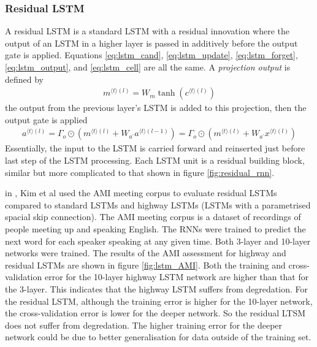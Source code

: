 \documentclass[a4paper,12pt]{article}
\theoremstyle{definition}
\begin{document}
\subsubsection{Residual LSTM \cite{kim}}
A residual LSTM is a standard LSTM with a residual innovation where the output of an LSTM in a higher layer is passed in additively before the output gate is applied. Equations \ref{eq:lstm_cand}, \ref{eq:lstm_update}, \ref{eq:lstm_forget}, \ref{eq:lstm_output}, and \ref{eq:lstm_cell} are all the same. A \textit{projection output} is defined by
\begin{align}
	m^{\langle t \rangle (l)} = W_m \tanh(c^{\langle t \rangle (l)})
\end{align}
the output from the previous layer's LSTM is added to this projection, then the output gate is applied
\begin{align}
	a^{\langle t \rangle (l)} = \Gamma_o \odot \left(m^{\langle t \rangle (l)} + W_{a^{\prime}}a^{\langle t \rangle (l-1)} \right) = \Gamma_o \odot \left(m^{\langle t \rangle (l)} + W_{a^{\prime}}x^{\langle t \rangle (l)} \right)
\end{align}
Essentially, the input to the LSTM is carried forward and reinserted just before last step of the LSTM processing. Each LSTM unit is a residual building block, similar but more complicated to that shown in figure \ref{fig:residual_rnn}.

in \cite{kim}, Kim et al used the AMI meeting corpus to evaluate residual LSTMs compared to standard LSTMs and highway LSTMs (LSTMs with a parametrised spacial skip connection). The AMI meeting corpus is a dataset of recordings of people meeting up and speaking English. The RNNs were trained to predict the next word for each speaker speaking at any given time. Both 3-layer and 10-layer networks were trained. The results of the AMI assessment for highway and residual LSTMs are shown in figure \ref{fig:lstm_AMI}. Both the training and cross-validation error for the 10-layer highway LSTM network are higher than that for the 3-layer. This indicates that the highway LSTM suffers from degredation. For the residual LSTM, although the training error is higher for the 10-layer network, the cross-validation error is lower for the deeper network. So the residual LTSM does not suffer from degredation. The higher training error for the deeper network could be due to better generalisation for data outside of the training set.
\end{document}
